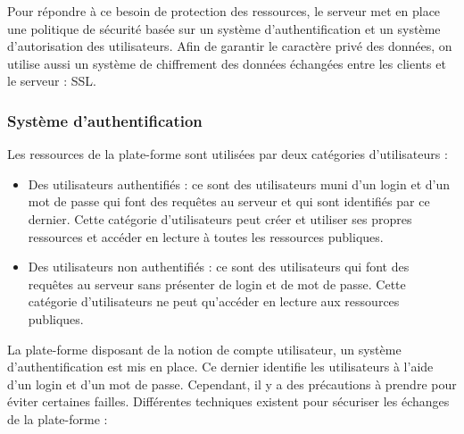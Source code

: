 \documentclass{report}
\begin{document}
Pour répondre 
à ce besoin de protection des ressources, le serveur met en place une
politique de sécurité basée sur un système d'authentification et un système
d'autorisation des utilisateurs.
Afin de garantir le caractère privé des données, on utilise aussi un système
de chiffrement des données échangées entre les clients et le serveur : SSL.

\subsubsection{Système d'authentification}
Les ressources de la plate-forme sont utilisées par deux catégories d'utilisateurs : 
\begin{itemize}
\item Des utilisateurs authentifiés : ce sont des utilisateurs muni d'un login et d'un mot de passe qui font des requêtes au 
serveur et qui sont identifiés par ce dernier. Cette catégorie
d'utilisateurs peut créer et utiliser ses propres ressources et
accéder en lecture à toutes les ressources publiques.
\item Des utilisateurs non authentifiés : ce sont des utilisateurs qui font des requêtes au serveur sans présenter de login 
et de mot de passe. Cette catégorie d'utilisateurs ne peut qu'accéder en
lecture aux ressources publiques.
\end{itemize}

La plate-forme disposant de la notion de compte utilisateur, un système d'authentification est mis en place. Ce dernier identifie les utilisateurs à l'aide d'un login et d'un mot de passe. Cependant, il y a des précautions à prendre pour éviter certaines 
failles. Différentes techniques existent pour sécuriser les échanges de la plate-forme :
\end{document}
